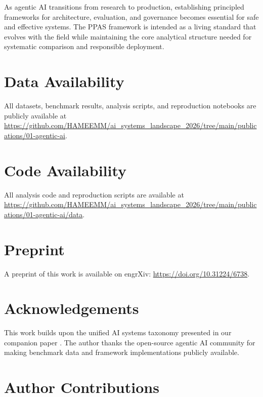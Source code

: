 \documentclass[review]{elsarticle}
\theoremstyle{definition}
\begin{document}
As agentic AI transitions from research to production, establishing principled frameworks for architecture, evaluation, and governance becomes essential for safe and effective systems. The PPAS framework is intended as a living standard that evolves with the field while maintaining the core analytical structure needed for systematic comparison and responsible deployment.


\section*{Data Availability}

All datasets, benchmark results, analysis scripts, and reproduction notebooks are publicly available at \url{https://github.com/HAMEEMM/ai_systems_landscape_2026/tree/main/publications/01-agentic-ai}.

\section*{Code Availability}

All analysis code and reproduction scripts are available at \url{https://github.com/HAMEEMM/ai_systems_landscape_2026/tree/main/publications/01-agentic-ai/data}.

\section*{Preprint}

A preprint of this work is available on engrXiv: \url{https://doi.org/10.31224/6738}.

\section*{Acknowledgements}

This work builds upon the unified AI systems taxonomy presented in our companion paper \citep{mahdi2026taxonomy}. The author thanks the open-source agentic AI community for making benchmark data and framework implementations publicly available.

\section*{Author Contributions}
\end{document}
